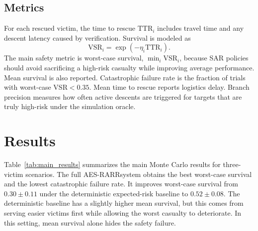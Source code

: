 \documentclass[runningheads]{llncs}
\newcommand{\aes}{AES-RARR}
\newcommand{\vsr}{\mathrm{VSR}}
\newcommand{\ttr}{\mathrm{TTR}}
\begin{document}
\subsection{Metrics}

For each rescued victim, the time to rescue $\ttr_i$ includes travel time and any descent latency caused by verification. Survival is modeled as
\begin{equation}
  \vsr_i=\exp(-\eta_i\ttr_i).
\end{equation}
The main safety metric is worst-case survival, $\min_i \vsr_i$, because SAR policies should avoid sacrificing a high-risk casualty while improving average performance. Mean survival is also reported. Catastrophic failure rate is the fraction of trials with worst-case $\vsr<0.35$. Mean time to rescue reports logistics delay. Branch precision measures how often active descents are triggered for targets that are truly high-risk under the simulation oracle.

\section{Results}

Table~\ref{tab:main_results} summarizes the main Monte Carlo results for three-victim scenarios. The full \aes system obtains the best worst-case survival and the lowest catastrophic failure rate. It improves worst-case survival from $0.30 \pm 0.11$ under the deterministic expected-risk baseline to $0.52 \pm 0.08$. The deterministic baseline has a slightly higher mean survival, but this comes from serving easier victims first while allowing the worst casualty to deteriorate. In this setting, mean survival alone hides the safety failure.
\end{document}
